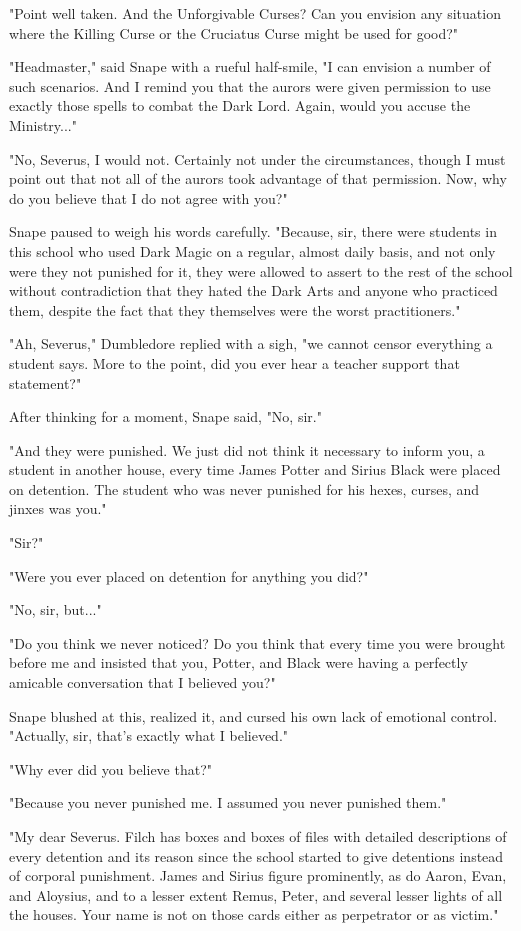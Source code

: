 "Point well taken. And the Unforgivable Curses? Can you envision any situation where the Killing Curse or the Cruciatus Curse might be used for good?"

"Headmaster," said Snape with a rueful half-smile, "I can envision a number of such scenarios. And I remind you that the aurors were given permission to use exactly those spells to combat the Dark Lord. Again, would you accuse the Ministry..."

"No, Severus, I would not. Certainly not under the circumstances, though I must point out that not all of the aurors took advantage of that permission. Now, why do you believe that I do not agree with you?"

Snape paused to weigh his words carefully. "Because, sir, there were students in this school who used Dark Magic on a regular, almost daily basis, and not only were they not punished for it, they were allowed to assert to the rest of the school without contradiction that they hated the Dark Arts and anyone who practiced them, despite the fact that they themselves were the worst practitioners."

"Ah, Severus," Dumbledore replied with a sigh, "we cannot censor everything a student says. More to the point, did you ever hear a teacher support that statement?"

After thinking for a moment, Snape said, "No, sir."

"And they were punished. We just did not think it necessary to inform you, a student in another house, every time James Potter and Sirius Black were placed on detention. The student who was never punished for his hexes, curses, and jinxes was you."

"Sir?"

"Were you ever placed on detention for anything you did?"

"No, sir, but..."

"Do you think we never noticed? Do you think that every time you were brought before me and insisted that you, Potter, and Black were having a perfectly amicable conversation that I believed you?"

Snape blushed at this, realized it, and cursed his own lack of emotional control. "Actually, sir, that's exactly what I believed."

"Why ever did you believe that?"

"Because you never punished me. I assumed you never punished them."

"My dear Severus. Filch has boxes and boxes of files with detailed descriptions of every detention and its reason since the school started to give detentions instead of corporal punishment. James and Sirius figure prominently, as do Aaron, Evan, and Aloysius, and to a lesser extent Remus, Peter, and several lesser lights of all the houses. Your name is not on those cards either as perpetrator or as victim."

